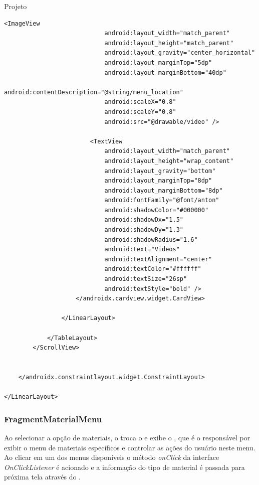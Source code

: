 \documentclass[
	12pt,				%
	openright,			%
	twoside,			%
	a4paper,			%
	english,			%
	french,				%
	spanish,			%
	brazil				%
	]{abntex2}
\begin{document}
\begin{chapter}{Projeto}
\begin{lstlisting}[numbers=none,
basicstyle=\small,
caption={Fragment Main.xml},
title={Fragment Main.xml},
xleftmargin=4pt,
label={fragment_main.xml}]
                        <ImageView
                            android:layout_width="match_parent"
                            android:layout_height="match_parent"
                            android:layout_gravity="center_horizontal"
                            android:layout_marginTop="5dp"
                            android:layout_marginBottom="40dp"
                            android:contentDescription="@string/menu_location"
                            android:scaleX="0.8"
                            android:scaleY="0.8"
                            android:src="@drawable/video" />

                        <TextView
                            android:layout_width="match_parent"
                            android:layout_height="wrap_content"
                            android:layout_gravity="bottom"
                            android:layout_marginTop="8dp"
                            android:layout_marginBottom="8dp"
                            android:fontFamily="@font/anton"
                            android:shadowColor="#000000"
                            android:shadowDx="1.5"
                            android:shadowDy="1.3"
                            android:shadowRadius="1.6"
                            android:text="Videos"
                            android:textAlignment="center"
                            android:textColor="#ffffff"
                            android:textSize="26sp"
                            android:textStyle="bold" />
                    </androidx.cardview.widget.CardView>

                </LinearLayout>

            </TableLayout>
        </ScrollView>


    </androidx.constraintlayout.widget.ConstraintLayout>

</LinearLayout>
\end{lstlisting}


\newpage
\subsubsection{FragmentMaterialMenu} \label{FragmentMaterialMenu}
Ao selecionar a opção de materiais, o  troca o  e exibe o , que é o  responsável por exibir o menu de materiais específicos e controlar as ações do usuário neste menu. Ao clicar em um dos menus disponíveis o método \textit{onClick} da interface \textit{OnClickListener} é acionado e a informação do tipo de material é passada para próxima tela através do .


\end{chapter}
\end{document}
